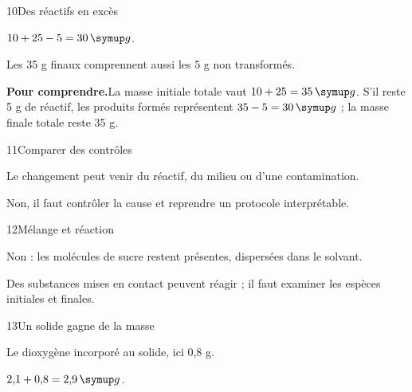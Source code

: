 \par\noindent\begin{minipage}{\linewidth}
\begin{corrige}{10}{Des réactifs en excès}
\begin{questions}
\item $10+25-5=30\unite g$.
\item Les 35 g finaux comprennent aussi les 5 g non transformés.
\end{questions}
\par\smallskip\noindent\textbf{Pour comprendre.}\enspace La masse initiale totale vaut $10+25=35\unite g$. S’il reste 5 g de réactif, les produits formés représentent $35-5=30\unite g$ ; la masse finale totale reste 35 g.\par
{}
\end{corrige}
\end{minipage}
\par\noindent\begin{minipage}{\linewidth}
\begin{corrige}{11}{Comparer des contrôles}
\begin{questions}
\item Le changement peut venir du réactif, du milieu ou d’une contamination.
\item Non, il faut contrôler la cause et reprendre un protocole interprétable.
\end{questions}
\end{corrige}
\end{minipage}
\par\noindent\begin{minipage}{\linewidth}
\begin{corrige}{12}{Mélange et réaction}
\begin{questions}
\item Non : les molécules de sucre restent présentes, dispersées dans le solvant.
\item Des substances mises en contact peuvent réagir ; il faut examiner les espèces initiales et finales.
\end{questions}
\end{corrige}
\end{minipage}
\par\noindent\begin{minipage}{\linewidth}
\begin{corrige}{13}{Un solide gagne de la masse}
\begin{questions}
\item Le dioxygène incorporé au solide, ici 0,8 g.
\item $2{,}1+0{,}8=2{,}9\unite g$.
\end{questions}
\end{corrige}
\end{minipage}
